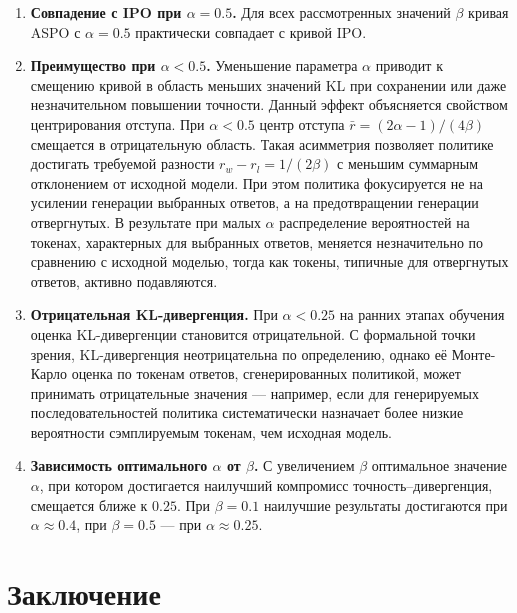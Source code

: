 \documentclass[a4paper,12pt]{article}
\begin{document}
\noindent\begin{enumerate}
    \item \textbf{Совпадение с IPO при $\alpha = 0.5$.} Для всех рассмотренных значений $\beta$ кривая ASPO с $\alpha = 0.5$ практически совпадает с кривой IPO.
    
    \item \textbf{Преимущество при $\alpha < 0.5$.} Уменьшение параметра $\alpha$ приводит к смещению кривой в область меньших значений KL при сохранении или даже незначительном повышении точности. Данный эффект объясняется свойством центрирования отступа. При $\alpha < 0.5$ центр отступа $\bar{r} = (2\alpha - 1)/(4\beta)$ смещается в отрицательную область. Такая асимметрия позволяет политике достигать требуемой разности $r_w - r_l = 1/(2\beta)$ с меньшим суммарным отклонением от исходной модели. При этом политика фокусируется не на усилении генерации выбранных ответов, а на предотвращении генерации отвергнутых. В результате при малых $\alpha$ распределение вероятностей на токенах, характерных для выбранных ответов, меняется незначительно по сравнению с исходной моделью, тогда как токены, типичные для отвергнутых ответов, активно подавляются.
    
    \item \textbf{Отрицательная KL-дивергенция.} При $\alpha < 0.25$  на ранних этапах обучения оценка KL-дивергенции становится отрицательной. С формальной точки зрения, KL-дивергенция неотрицательна по определению, однако её Монте-Карло оценка по токенам ответов, сгенерированных политикой, может принимать отрицательные значения — например, если для генерируемых последовательностей политика систематически назначает более низкие вероятности сэмплируемым токенам, чем исходная модель.
    
    \item \textbf{Зависимость оптимального $\alpha$ от $\beta$.} С увеличением $\beta$ оптимальное значение $\alpha$, при котором достигается наилучший компромисс точность–дивергенция, смещается ближе к $0.25$. При $\beta = 0.1$ наилучшие результаты достигаются при $\alpha \approx 0.4$, при $\beta = 0.5$ — при $\alpha \approx 0.25$.
\end{enumerate}






\section{Заключение}
\end{document}
